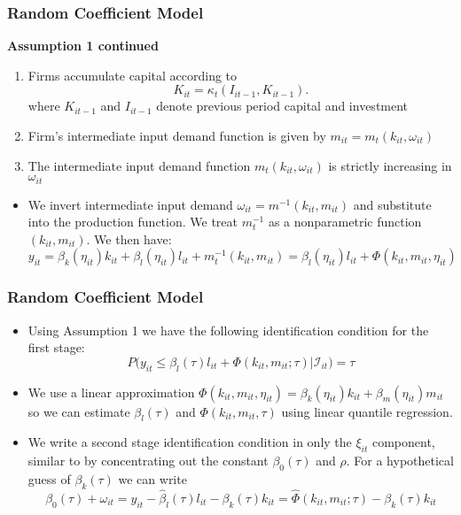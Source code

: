 \documentclass{beamer}
\begin{document}
\begin{frame}
\frametitle{Random Coefficient Model}
\textbf{Assumption 1 continued}
\begin{enumerate}
	\item Firms accumulate capital according to
	\begin{equation}
	    K_{it}=\kappa_{t}(I_{it-1}, K_{it-1}).
	\end{equation}
	where $K_{it-1}$ and $I_{it-1}$ denote previous period capital and investment
	\item Firm's intermediate input demand function is given by $m_{it}=m_{t}(k_{it}, \omega_{it})$
	\item The intermediate input demand function $m_{t}(k_{it}, \omega_{it})$ is strictly increasing in $\omega_{it}$
\end{enumerate}
\begin{itemize}
	\item We invert intermediate input demand $\omega_{it}=m^{-1}(k_{it}, m_{it})$ and substitute into the production function. We treat $m_{t}^{-1}$ as a nonparametric function $(k_{it}, m_{it})$. We then have:
	\begin{equation} \label{qpf1st}
		y_{it}=\beta_{k}(\eta_{it})k_{it}+\beta_{l}(\eta_{it})l_{it}+m_{t}^{-1}(k_{it}, m_{it})=\beta_{l}(\eta_{it})l_{it}+\Phi(k_{it}, m_{it}, \eta_{it})
	\end{equation}
\end{itemize}
\end{frame}


\begin{frame}
\frametitle{Random Coefficient Model}
\begin{itemize}
	\item Using Assumption 1 we have the following identification condition for the first stage:
		\begin{equation}
			P\big(y_{it}\leq \beta_{l}(\tau)l_{it}+\Phi(k_{it}, m_{it}; \tau)\big|\mathcal{I}_{it})=\tau
		\end{equation}
	\item We use a linear approximation $\Phi(k_{it}, m_{it}, \eta_{it})=\beta_{k}(\eta_{it})k_{it}+\beta_{m}(\eta_{it})m_{it}$ so we can estimate $\beta_{l}(\tau)$ and $\Phi(k_{it}, m_{it}, \tau)$ using linear quantile regression.
	\item We write a second stage identification condition in only the $\xi_{it}$ component, similar to \cite{Ackerberg2015} by concentrating out the constant $\beta_{0}(\tau)$ and $\rho$. For a hypothetical guess of $\beta_{k}(\tau)$ we can write
	\begin{equation}
		\beta_{0}(\tau)+\omega_{it}=y_{it}-\hat{\beta}_{l}(\tau)l_{it}-\beta_{k}(\tau)k_{it}=\hat{\Phi}(k_{it}, m_{it}; \tau)-\beta_{k}(\tau)k_{it}
\end{equation}
\end{itemize}
\end{frame}
\end{document}
